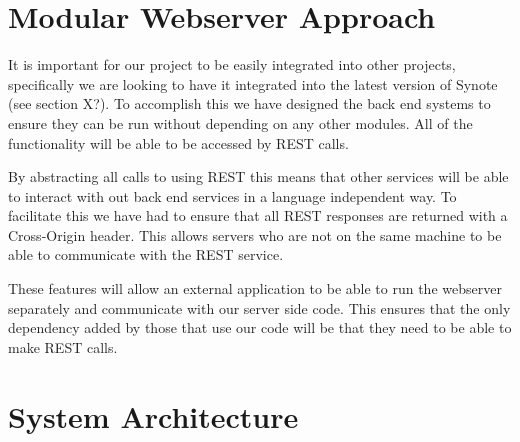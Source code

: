 \section{Modular Webserver Approach}
\label{Section:Modular Approach}
It is important for our project to be easily integrated into other projects, specifically we are looking to have it integrated into the latest version of Synote (see section X?). To accomplish this we have designed the back end systems to ensure they can be run without depending on any other modules. All of the functionality will be able to be accessed by \gls{REST} calls.

By abstracting all calls to using \gls{REST} this means that other services will be able to interact with out back end services in a language independent way. To facilitate this we have had to ensure that all \gls{REST} responses are returned with a Cross-Origin header. This allows servers who are not on the same machine to be able to communicate with the \gls{REST} service.

These features will allow an external application to be able to run the webserver separately and communicate with our server side code. This ensures that the only dependency added by those that use our code will be that they need to be able to make \gls{REST} calls.

\section{System Architecture}



